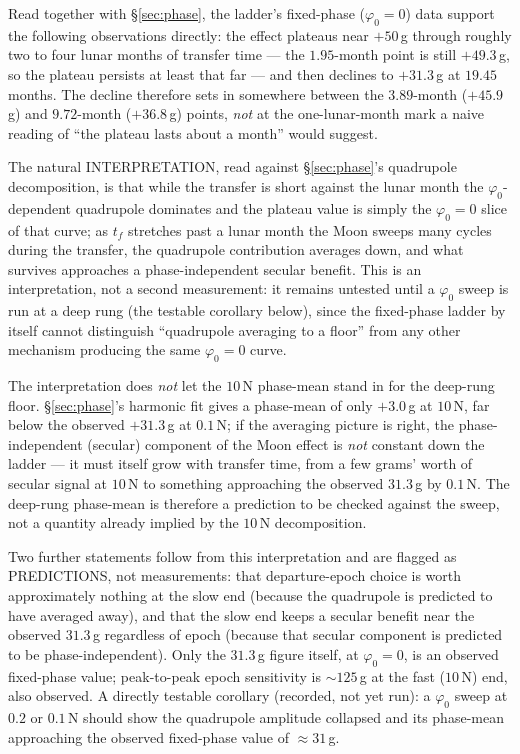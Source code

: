 \documentclass[11pt]{article}
\begin{document}
Read together with \S\ref{sec:phase}, the ladder's fixed-phase
($\varphi_0 = 0$) data support the following observations directly: the
effect plateaus near $+50$\,g through roughly two to four lunar months of
transfer time --- the $1.95$-month point is still $+49.3$\,g, so the
plateau persists at least that far --- and then declines to $+31.3$\,g at
$19.45$ months. The decline therefore sets in somewhere between the
$3.89$-month ($+45.9$\,g) and $9.72$-month ($+36.8$\,g) points, \emph{not}
at the one-lunar-month mark a naive reading of ``the plateau lasts about a
month'' would suggest.

The natural INTERPRETATION, read against \S\ref{sec:phase}'s quadrupole
decomposition, is that while the transfer is short against the lunar month
the $\varphi_0$-dependent quadrupole dominates and the plateau value is
simply the $\varphi_0 = 0$ slice of that curve; as $t_f$ stretches past a
lunar month the Moon sweeps many cycles during the transfer, the
quadrupole contribution averages down, and what survives approaches a
phase-independent secular benefit. This is an interpretation, not a
second measurement: it remains untested until a $\varphi_0$ sweep is run
at a deep rung (the testable corollary below), since the fixed-phase
ladder by itself cannot distinguish ``quadrupole averaging to a floor''
from any other mechanism producing the same $\varphi_0 = 0$ curve.

The interpretation does \emph{not} let the $10$\,N phase-mean stand in for
the deep-rung floor. \S\ref{sec:phase}'s harmonic fit gives a phase-mean of
only $+3.0$\,g at $10$\,N, far below the observed $+31.3$\,g at $0.1$\,N;
if the averaging picture is right, the phase-independent (secular)
component of the Moon effect is \emph{not} constant down the ladder --- it
must itself grow with transfer time, from a few grams' worth of secular
signal at $10$\,N to something approaching the observed $31.3$\,g by
$0.1$\,N. The deep-rung phase-mean is therefore a prediction to be
checked against the sweep, not a quantity already implied by the $10$\,N
decomposition.

Two further statements follow from this interpretation and are flagged as
PREDICTIONS, not measurements: that departure-epoch choice is worth
approximately nothing at the slow end (because the quadrupole is
predicted to have averaged away), and that the slow end keeps a secular
benefit near the observed $31.3$\,g regardless of epoch (because that
secular component is predicted to be phase-independent). Only the
$31.3$\,g figure itself, at $\varphi_0 = 0$, is an observed fixed-phase
value; peak-to-peak epoch sensitivity is $\sim 125$\,g at the fast ($10$\,N)
end, also observed. A directly testable corollary (recorded, not yet run):
a $\varphi_0$ sweep at $0.2$ or $0.1$\,N should show the quadrupole
amplitude collapsed and its phase-mean approaching the observed
fixed-phase value of $\approx 31$\,g.
\end{document}

